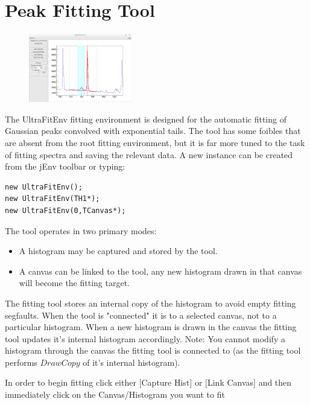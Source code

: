 \documentclass[a4paper,10pt]{article}
\begin{document}
\section{Peak Fitting Tool}\label{sec:peakfit}
\begin{figure}
\includegraphics[width=0.4\textwidth]{jFitB.png}
\end{figure}
The UltraFitEnv fitting environment is designed for the automatic fitting of Gaussian peaks convolved with exponential tails.
The tool has some foibles that are absent from the root fitting environment, but it is far more tuned to the task of fitting spectra and saving the relevant data.
A new instance can be created from the jEnv toolbar or typing:
\lstset{language=C++}
\begin{lstlisting}
new UltraFitEnv();
new UltraFitEnv(TH1*);
new UltraFitEnv(0,TCanvas*);
\end{lstlisting}
The tool operates in two primary modes:
\begin{itemize}
\item A histogram may be captured and stored by the tool.
\item A canvas can be linked to the tool, any new histogram drawn in that canvas will become the fitting target.
\end{itemize}

The fitting tool stores an internal copy of the histogram to avoid empty fitting segfaults. When the tool is "connected" it is to a selected canvas, not to a particular histogram. When a new histogram is drawn in the canvas the fitting tool updates it's internal histogram accordingly. Note: You cannot modify a histogram through the canvas the fitting tool is connected to (as the fitting tool performs $DrawCopy$ of it's internal histogram).

In order to begin fitting click either $[$Capture Hist$]$ or $[$Link Canvas$]$ and then immediately click on the Canvas/Histogram you want to fit
\end{document}
